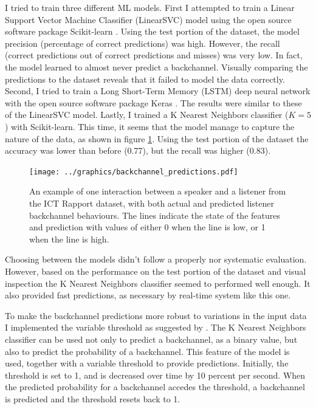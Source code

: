 \documentclass[]{simple-thesis}
\begin{document}
I tried to train three different ML models.
First I attempted to train a Linear Support Vector Machine Classifier (LinearSVC) model using the open source software package Scikit-learn \citep{Pedregosa2011}.
Using the test portion of the dataset, the model precision (percentage of correct predictions) was high.
However, the recall (correct predictions out of correct predictions and misses) was very low.
In fact, the model learned to almost never predict a backchannel.
Visually comparing the predictions to the dataset reveals that it failed to model the data correctly.
Second, I tried to train a Long Short-Term Memory (LSTM) deep neural network with the open source software package Keras \citep{Chollet2015}.
The results were similar to these of the LinearSVC model.
Lastly, I trained a K Nearest Neighbors classifier ($K = 5$) with Scikit-learn.
This time, it seems that the model manage to capture the nature of the data, as shown in figure \ref{fig:system:backchannel_predictions}.
Using the test portion of the dataset the accuracy was lower than before (0.77), but the recall was higher (0.83).

\begin{figure}
  \texttt{[image: ../graphics/backchannel\_predictions.pdf]}
  \caption{An example of one interaction between a speaker and a listener from the ICT Rapport dataset, with both actual and predicted listener backchannel behaviours. The lines indicate the state of the features and prediction with values of either 0 when the line is low, or 1 when the line is high.}
  \label{fig:system:backchannel_predictions}
\end{figure}

Choosing between the models didn't follow a properly nor systematic evaluation.
However, based on the performance on the test portion of the dataset and visual inspection the K Nearest Neighbors classifier seemed to performed well enough.
It also provided fast predictions, as necessary by real-time system like this one.

To make the backchannel predictions more robust to variations in the input data I implemented the variable threshold as suggested by \cite{Kok2012}.
The K Nearest Neighbors classifier can be used not only to predict a backchannel, as a binary value, but also to predict the probability of a backchannel.
This feature of the model is used, together with a variable threshold to provide predictions.
Initially, the threshold is set to 1, and is decreased over time by 10 percent per second.
When the predicted probability for a backchannel accedes the threshold, a backchannel is predicted and the threshold resets back to 1.
\end{document}
